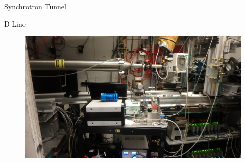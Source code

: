 \documentclass[10pt]{beamer}
\begin{document}
\begin{frame}{Synchrotron Tunnel}
\begin{figure}
\begin{minipage}{0.5\textwidth}
	\end{minipage}
	
\end{figure}

\end{frame}

\begin{frame}{D-Line}
\begin{figure}
	\includegraphics[scale=0.15]{chess3.JPG}
\end{figure}
\end{frame}

%	
	
\end{document}
